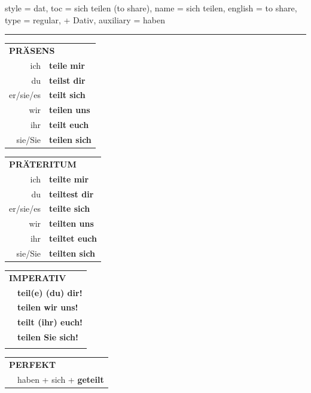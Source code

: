 \begin{verbentry}{
  style = {dat},
  toc = {sich teilen (to share)},
  name = {sich teilen},
  english = {to share},
  type = {regular, + Dativ},
  auxiliary = {haben}
}
 
    
     \vspace{5pt}

    \hrule
    
    \vspace{5pt}

  \begin{tabular}{rl}
     \multicolumn{2}{l}{\textbf{PRÄSENS} }\\
    ich & \textbf{teile mir}\\
    du & \textbf{teilst dir}\\
    er/sie/es & \textbf{teilt sich}\\
    wir & \textbf{teilen uns}\\
    ihr & \textbf{teilt euch}\\
    sie/Sie & \textbf{teilen sich}\\
  \end{tabular}
  \hfill
     \begin{tabular}{rl}
    \multicolumn{2}{l}{\textbf{PRÄTERITUM} }\\
    ich & \textbf{teilte mir}\\
    du & \textbf{teiltest dir}\\
    er/sie/es & \textbf{teilte sich}\\
    wir & \textbf{teilten uns}\\
    ihr & \textbf{teiltet euch}\\
    sie/Sie & \textbf{teilten sich}\\
  \end{tabular}
  \hfill
  \begin{tabular}{rl}
     \multicolumn{2}{l}{\textbf{IMPERATIV} }\\
   & \textbf{teil(e) (du) dir!}\\
   & \textbf{teilen wir uns!}\\
   & \textbf{teilt (ihr) euch!}\\
   & \textbf{teilen Sie sich!}\\
   & \vspace{10pt}
  \end{tabular}

    \vspace{10pt}

 \begin{tabular}{rl}
     \multicolumn{2}{l}{\textbf{PERFEKT}}\\
    &haben + sich + \textbf{geteilt}\\
  \end{tabular}
\hfill
   \begin{tabular}{rl}
   

\end{tabular}
\end{verbentry}
